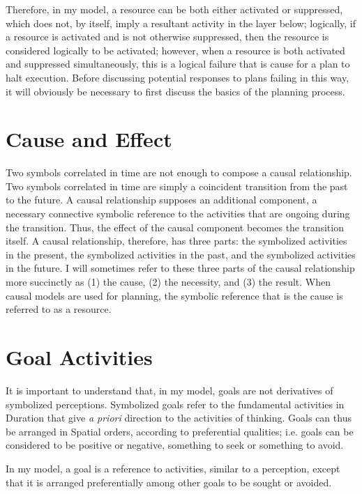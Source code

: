 Therefore, in my model, a resource can be both either activated or
suppressed, which does not, by itself, imply a resultant activity in
the layer below; logically, if a resource is activated and is not
otherwise suppressed, then the resource is considered logically to be
activated; however, when a resource is both activated and suppressed
simultaneously, this is a logical failure that is cause for a plan to
halt execution.  Before discussing potential responses to plans
failing in this way, it will obviously be necessary to first discuss
the basics of the planning process.

\section{Cause and Effect}

Two symbols correlated in time are not enough to compose a causal
relationship.  Two symbols correlated in time are simply a coincident
transition from the past to the future.  A causal relationship
supposes an additional component, a necessary connective symbolic
reference to the activities that are ongoing during the transition.
Thus, the effect of the causal component becomes the transition
itself.  A causal relationship, therefore, has three parts: the
symbolized activities in the present, the symbolized activities in the
past, and the symbolized activities in the future.  I will sometimes
refer to these three parts of the causal relationship more succinctly
as (1) the cause, (2) the necessity, and (3) the result.  When causal
models are used for planning, the symbolic reference that is the cause
is referred to as a resource.

\section{Goal Activities}

It is important to understand that, in my model, goals are not
derivatives of symbolized perceptions.  Symbolized goals refer to the
fundamental activities in Duration that give \emph{a priori} direction
to the activities of thinking.  Goals can thus be arranged in Spatial
orders, according to preferential qualities; i.e. goals can be
considered to be positive or negative, something to seek or something
to avoid.

In my model, a goal is a reference to activities, similar to a
perception, except that it is arranged preferentially among other
goals to be sought or avoided.

